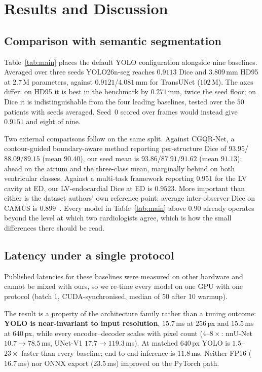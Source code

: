 \section{Results and Discussion}
\label{sec:results}

\subsection{Comparison with semantic segmentation}

Table~\ref{tab:main} places the default YOLO configuration alongside nine
baselines. Averaged over three seeds YOLO26n-seg reaches $0.9113$ Dice and
$3.809$\,mm HD95 at $2.7$\,M parameters, against $0.9121$/$4.081$\,mm for
TransUNet ($102$\,M). The axes differ: on HD95 it is best in the benchmark by
$0.271$\,mm, twice the seed floor; on Dice it is indistinguishable from the four
leading baselines, tested over the $50$ patients with seeds averaged. Seed~0
scored over frames would instead give $0.9151$ and eight of nine.



Two external comparisons follow on the same split. Against CGQR-Net, a
contour-guided boundary-aware method reporting per-structure Dice of
$93.95$/$88.09$/$89.15$ (mean $90.40$), our seed mean is
$93.86$/$87.91$/$91.62$ (mean $91.13$): ahead on the atrium and the
three-class mean, marginally behind on both ventricular classes. Against a multi-task framework reporting
$0.951$ for the LV cavity at ED, our LV-endocardial Dice at ED is $0.9523$. More
important than either is the dataset authors' own reference point: average
inter-observer Dice on CAMUS is $0.899$~\cite{leclerc2019camus}. Every model in
Table~\ref{tab:main} above $0.90$ already operates beyond the level at which two
cardiologists agree, which is how the small differences there should be read.

\subsection{Latency under a single protocol}

Published latencies for these baselines were measured on other hardware and
cannot be mixed with ours, so we re-time every model on one GPU with one
protocol (batch 1, CUDA-synchronised, median of 50 after 10 warmup).

The result is a property of the architecture family rather than a tuning
outcome: \textbf{YOLO is near-invariant to input resolution}, $15.7$\,ms at
$256$\,px and $15.5$\,ms at $640$\,px, while every encoder--decoder scales with
pixel count ($4$--$8\times$: nnU-Net $10.7\rightarrow78.5$\,ms, UNet-V1
$17.7\rightarrow119.3$\,ms). At matched $640$\,px YOLO is $1.5$--$23\times$
faster than every baseline; end-to-end inference is $11.8$\,ms. Neither FP16
($16.7$\,ms) nor ONNX export ($23.5$\,ms) improved on the PyTorch path.

